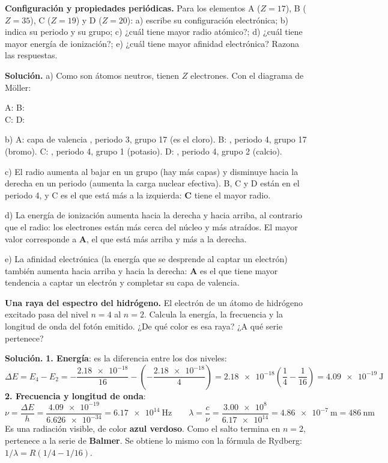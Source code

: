 \begin{example}
    \textbf{Configuración y propiedades periódicas.} Para los elementos A (\(Z = 17\)), B (\(Z = 35\)), C (\(Z = 19\)) y
    D (\(Z = 20\)): a) escribe su configuración electrónica; b) indica su periodo y su grupo; c) ¿cuál tiene mayor radio atómico?;
    d) ¿cuál tiene mayor energía de ionización?; e) ¿cuál tiene mayor afinidad electrónica? Razona las respuestas.

    \textbf{Solución.} a) Como son átomos neutros, tienen \(Z\) electrones. Con el diagrama de Möller:
    \begin{center}
        A:  \qquad B:  \\[2pt]
        C:  \qquad D: 
    \end{center}

    b) A: capa de valencia , periodo 3, grupo 17 (es el cloro). B: , periodo 4, grupo 17
    (bromo). C: , periodo 4, grupo 1 (potasio). D: , periodo 4, grupo 2 (calcio).

    c) El radio aumenta al bajar en un grupo (hay más capas) y disminuye hacia la derecha en un periodo (aumenta la carga nuclear
    efectiva). B, C y D están en el periodo 4, y C es el que está más a la izquierda: \textbf{C} tiene el mayor radio.

    d) La energía de ionización aumenta hacia la derecha y hacia arriba, al contrario que el radio: los electrones están más
    cerca del núcleo y más atraídos. El mayor valor corresponde a \textbf{A}, el que está más arriba y más a la derecha.

    e) La afinidad electrónica (la energía que se desprende al captar un electrón) también aumenta hacia arriba y hacia la
    derecha: \textbf{A} es el que tiene mayor tendencia a captar un electrón y completar su capa de valencia.
\end{example}

\begin{example}
    \textbf{Una raya del espectro del hidrógeno.} El electrón de un átomo de hidrógeno excitado pasa del nivel \(n = 4\) al
    \(n = 2\). Calcula la energía, la frecuencia y la longitud de onda del fotón emitido. ¿De qué color es esa raya? ¿A qué serie
    pertenece?

    \textbf{Solución.} \textbf{1. Energía}: es la diferencia entre los dos niveles:
    \[ \Delta E = E_4 - E_2 = -\frac{\num{2.18e-18}}{16} - \left( -\frac{\num{2.18e-18}}{4} \right) = \num{2.18e-18} \left( \frac{1}{4} - \frac{1}{16} \right) = \qty{4.09e-19}{\joule} \]
    \textbf{2. Frecuencia y longitud de onda}:
    \[ \nu = \frac{\Delta E}{h} = \frac{\num{4.09e-19}}{\num{6.626e-34}} = \qty{6.17e14}{\hertz} \qquad
    \lambda = \frac{c}{\nu} = \frac{\num{3.00e8}}{\num{6.17e14}} = \qty{4.86e-7}{\m} = \qty{486}{\nm} \]
    Es una radiación visible, de color \textbf{azul verdoso}. Como el salto termina en \(n = 2\), pertenece a la serie de
    \textbf{Balmer}. Se obtiene lo mismo con la fórmula de Rydberg: \(1/\lambda = R(1/4 - 1/16)\).
\end{example}

